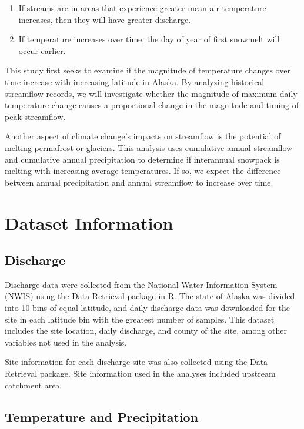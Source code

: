 \documentclass[12pt,]{article}
\begin{document}
\begin{enumerate}
\def\labelenumi{\arabic{enumi})}
\setcounter{enumi}{1}
\item
  If streams are in areas that experience greater mean air temperature
  increases, then they will have greater discharge.
\item
  If temperature increases over time, the day of year of first snowmelt
  will occur earlier.
\end{enumerate}

This study first seeks to examine if the magnitude of temperature
changes over time increase with increasing latitude in Alaska. By
analyzing historical streamflow records, we will investigate whether the
magnitude of maximum daily temperature change causes a proportional
change in the magnitude and timing of peak streamflow.

Another aspect of climate change's impacts on streamflow is the
potential of melting permafrost or glaciers. This analysis uses
cumulative annual streamflow and cumulative annual precipitation to
determine if interannual snowpack is melting with increasing average
temperatures. If so, we expect the difference between annual
precipitation and annual streamflow to increase over time.

\newpage

\hypertarget{dataset-information}{%
\section{Dataset Information}\label{dataset-information}}

\hypertarget{discharge}{%
\subsection{Discharge}\label{discharge}}

Discharge data were collected from the National Water Information System
(NWIS) using the Data Retrieval package in R. The state of Alaska was
divided into 10 bins of equal latitude, and daily discharge data was
downloaded for the site in each latitude bin with the greatest number of
samples. This dataset includes the site location, daily discharge, and
county of the site, among other variables not used in the analysis.

Site information for each discharge site was also collected using the
Data Retrieval package. Site information used in the analyses included
upstream catchment area.

\hypertarget{temperature-and-precipitation}{%
\subsection{Temperature and
Precipitation}\label{temperature-and-precipitation}}
\end{document}

